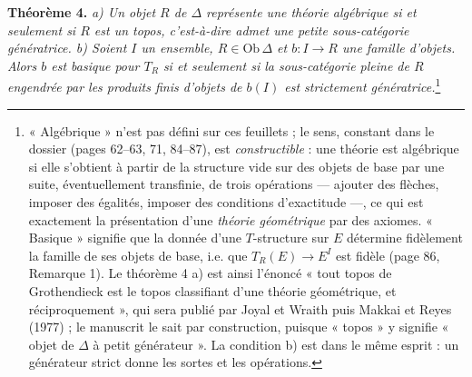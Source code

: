 \documentclass[11pt,a4paper]{article}
\begin{document}
\textbf{Théorème 4.} \emph{a) Un objet $R$ de $\Delta$ représente une théorie
algébrique si et seulement si $R$ est un topos, c'est-à-dire admet une
petite sous-catégorie génératrice. b) Soient $I$ un ensemble, $R \in
\mathrm{Ob}\,\Delta$ et $b : I \to R$ une famille d'objets. Alors $b$ est
basique pour $T_{R}$ si et seulement si la sous-catégorie pleine de $R$
engendrée par les produits finis d'objets de $b(I)$ est strictement
génératrice.}\footnote{« Algébrique » n'est pas défini sur ces feuillets ;
le sens, constant dans le dossier (pages 62--63, 71, 84--87), est
\emph{constructible} : une théorie est algébrique si elle s'obtient à
partir de la structure vide sur des objets de base par une suite,
éventuellement transfinie, de trois opérations — ajouter des flèches,
imposer des égalités, imposer des conditions d'exactitude —, ce qui est
exactement la présentation d'une \emph{théorie géométrique} par des
axiomes. « Basique » signifie que la donnée d'une $T$-structure sur $E$
détermine fidèlement la famille de ses objets de base, i.e. que $T_{R}(E)
\to E^{I}$ est fidèle (page 86, Remarque 1). Le théorème 4 a) est ainsi
l'énoncé « tout topos de Grothendieck est le topos classifiant d'une
théorie géométrique, et réciproquement », qui sera publié par Joyal et
Wraith puis Makkai et Reyes (1977) ; le manuscrit le sait par construction,
puisque « topos » y signifie « objet de $\Delta$ à petit générateur ». La
condition b) est dans le même esprit : un générateur strict donne les
sortes et les opérations.}
\end{document}
